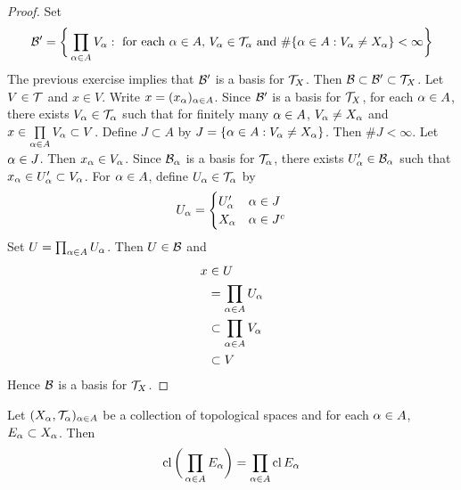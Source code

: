 \documentclass{book}
\begin{document}
	\begin{proof}
		Set 
		$$\mathcal{B}' = \bigg \{\prod_{\alpha \in A}V_{\alpha}: \text{ for each $\alpha \in A$,  $V_{\alpha} \in \mathcal{T}_{\alpha}$ and $\# \{\alpha \in A: V_{\alpha} \neq X_{\alpha}\} < \infty$} \bigg\}$$
		The previous exercise implies that $\mathcal{B}'$ is a basis for $\mathcal{T}_X$. Then $\mathcal{B} \subset \mathcal{B}' \subset \mathcal{T}_X$. Let $V \in \mathcal{T}$ and $x \in V$. Write $x = (x_{\alpha})_{\alpha \in A}$. Since $\mathcal{B}'$ is a basis for $\mathcal{T}_X$, for each $\alpha \in A$, there exists $V_{\alpha} \in \mathcal{T}_{\alpha}$ such that for finitely many $\alpha \in A$, $V_{\alpha} \neq X_{\alpha}$ and $x \in \prod\limits_{\alpha \in A} V_{\alpha} \subset V$. Define $J \subset A$ by $J = \{\alpha \in A: V_{\alpha} \neq X_{\alpha}\}$. Then $\#J < \infty$. Let $\alpha \in J$. Then $x_{\alpha} \in V_{\alpha}$. Since $\mathcal{B}_{\alpha}$ is a basis for $\mathcal{T}_{\alpha}$, there exists $U'_{\alpha} \in \mathcal{B}_{\alpha}$ such that $x_{\alpha} \in U'_{\alpha} \subset V_{\alpha}$. For $\alpha \in A$, define $U_{\alpha} \in \mathcal{T}_{\alpha}$ by 
		\[
		U_{\alpha} =
		\begin{cases}
			U'_{\alpha} & \alpha \in J \\
			X_{\alpha} & \alpha \in J^c
		\end{cases}
		\]
		Set $U = \prod_{\alpha \in A} U_{\alpha}$. Then $U \in \mathcal{B}$ and 
		\begin{align*}
			x 
			& \in U \\
			& = \prod_{\alpha \in A} U_{\alpha} \\
			& \subset \prod\limits_{\alpha \in A} V_{\alpha} \\
			& \subset V
		\end{align*}
		Hence $\mathcal{B}$ is a basis for $\mathcal{T}_X$.
	\end{proof}

	\begin{ex}
		Let $(X_{\alpha}, \mathcal{T}_{\alpha})_{\alpha \in A}$ be a collection of topological spaces and for each $\alpha \in A$, $E_{\alpha} \subset X_{\alpha}$. Then 
		$$\operatorname{cl} \bigg( \prod_{\alpha \in A} E_{\alpha} \bigg) = \prod_{\alpha \in A} \operatorname{cl} E_{\alpha}$$ 
		 
	\end{ex}
\end{document}
